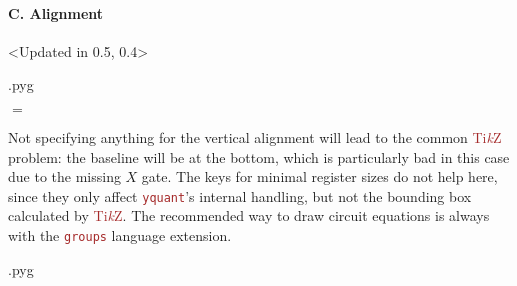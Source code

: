 \documentclass{scrartcl}
\makeatletter
\newenvironment{codeexample}{%
   \VerbatimEnvironment%
   \let\FVB@VerbatimOut\minted@FVB@VerbatimOut
   \let\FVE@VerbatimOut\minted@FVE@VerbatimOut
   \minted@configlang{tex}%
   \minted@fvset
   \begin{VerbatimOut}[codes={\catcode`\^^I=12},firstline,lastline]{\minted@jobname.pyg}%
}{
   \end{VerbatimOut}%
   \minted@langlinenoson%
   \savebox\codeexamplebox{ \minted@jobname.pyg}%
   \ifdim\wd\codeexamplebox>\dimexpr.5\linewidth-3mm\relax%
      \wd\codeexamplebox=.5\linewidth%
   \else%
      \wd\codeexamplebox=\dimexpr\wd\codeexamplebox+3mm\relax%
   \fi%
   \noindent\begin{minipage}{\wd\codeexamplebox}%
      \centering%
      \usebox\codeexamplebox%
   \end{minipage}%
   \begin{minipage}{\dimexpr\linewidth-\wd\codeexamplebox\relax}%
      \expandafter\minted@pygmentize\expandafter{\minted@lang}%
   \end{minipage}%
   \minted@langlinenosoff%
   \par%
}
\def\TikZ{\textcolor{brown}{Ti\textit kZ}}
\def\pkg#1{\textcolor{brown}{\texttt{#1}}}
\def\Yquant{\pkg{yquant}}
\makeatother
\begin{document}
            \paragraph{C. Alignment}\leavevmode
               \begin{example}<Updated in 0.5, 0.4>
                  \begin{codeexample}
$=$
                  \end{codeexample}
                  Not specifying anything for the vertical alignment will lead to the common \TikZ{} problem: the baseline will be at the bottom, which is particularly bad in this case due to the missing $X$ gate.
                  The keys for minimal register sizes do not help here, since they only affect \Yquant's internal handling, but not the bounding box calculated by \TikZ.
                  The recommended way to draw circuit equations is always with the \pkg{groups} language extension.

                  \begin{codeexample}
\begin{yquantgroup}
   \equals
\end{yquantgroup}
                  \end{codeexample}
               \end{example}
\end{document}
